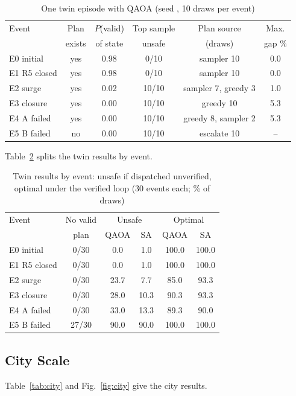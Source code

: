 \documentclass[conference]{IEEEtran}
\begin{document}
\begin{table}[t]
\caption{One twin episode with QAOA (seed \TraceSeedNo, 10 draws per event)}
\label{tab:trace}
\centering
\footnotesize
\setlength{\tabcolsep}{2.2pt}
\begin{tabular}{lccccc}
\toprule
Event & Plan & $P$(valid) & Top sample & Plan source & Max.\\
 & exists & of state & unsafe & (draws) & gap \%\\
\midrule
E0 initial & yes & 0.98 & 0/10 & sampler 10 & 0.0\\
E1 R5 closed & yes & 0.98 & 0/10 & sampler 10 & 0.0\\
E2 surge & yes & 0.02 & 10/10 & sampler 7, greedy 3 & 1.0\\
E3 closure & yes & 0.00 & 10/10 & greedy 10 & 5.3\\
E4 A failed & yes & 0.00 & 10/10 & greedy 8, sampler 2 & 5.3\\
E5 B failed & no & 0.00 & 10/10 & escalate 10 & --\\
\bottomrule
\end{tabular}
\end{table}

Table~\ref{tab:event} splits the twin results by event. \EventText{}

\begin{table}[t]
\caption{Twin results by event: unsafe if dispatched unverified, optimal under the verified loop (30 events each; \% of draws)}
\label{tab:event}
\centering
\footnotesize
\setlength{\tabcolsep}{3pt}
\begin{tabular}{lccccc}
\toprule
Event & No valid & \multicolumn{2}{c}{Unsafe} & \multicolumn{2}{c}{Optimal}\\
 & plan & QAOA & SA & QAOA & SA\\
\midrule
E0 initial & 0/30 & 0.0 & 1.0 & 100.0 & 100.0\\
E1 R5 closed & 0/30 & 0.0 & 1.0 & 100.0 & 100.0\\
E2 surge & 0/30 & 23.7 & 7.7 & 85.0 & 93.3\\
E3 closure & 0/30 & 28.0 & 10.3 & 90.3 & 93.3\\
E4 A failed & 0/30 & 33.0 & 13.3 & 89.3 & 90.0\\
E5 B failed & 27/30 & 90.0 & 90.0 & 100.0 & 100.0\\
\bottomrule
\end{tabular}
\end{table}

\subsection{City Scale}
Table~\ref{tab:city} and Fig.~\ref{fig:city} give the city results. \CityText{}
\end{document}
